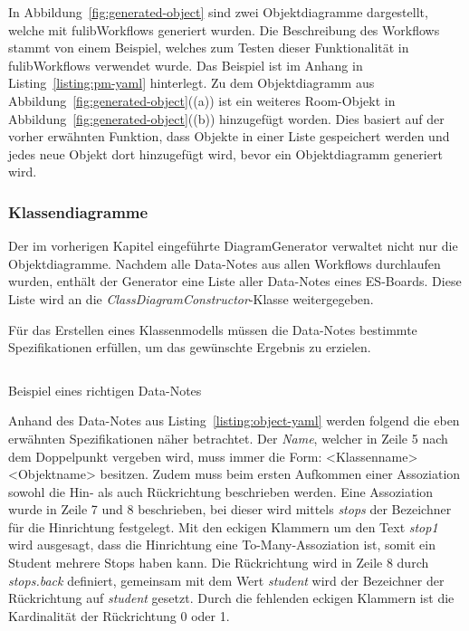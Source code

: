 
In Abbildung~\ref{fig:generated-object} sind zwei Objektdiagramme dargestellt, welche mit fulibWorkflows generiert wurden.
Die Beschreibung des Workflows stammt von einem Beispiel, welches zum Testen dieser Funktionalität in fulibWorkflows verwendet wurde.
Das Beispiel ist im Anhang in Listing~\ref{listing:pm-yaml} hinterlegt.
Zu dem Objektdiagramm aus Abbildung~\ref{fig:generated-object}((a)) ist ein weiteres Room-Objekt in Abbildung~\ref{fig:generated-object}((b)) hinzugefügt worden.
Dies basiert auf der vorher erwähnten Funktion, dass Objekte in einer Liste gespeichert werden und jedes neue Objekt dort hinzugefügt wird, bevor ein Objektdiagramm generiert wird.

\subsubsection{Klassendiagramme}
Der im vorherigen Kapitel eingeführte DiagramGenerator verwaltet nicht nur die Objektdiagramme.
Nachdem alle Data-Notes aus allen Workflows durchlaufen wurden, enthält der Generator eine Liste aller Data-Notes eines \ac{ES}-Boards.
Diese Liste wird an die \textit{ClassDiagramConstructor}-Klasse weitergegeben.

Für das Erstellen eines Klassenmodells müssen die Data-Notes bestimmte Spezifikationen erfüllen, um das gewünschte Ergebnis zu erzielen.

\begin{listing}[!ht]
    \inputminted[firstnumber=5]{yaml}{listings/3.1.4/data.es.yaml}
    \caption{Beispiel eines richtigen Data-Notes}
    \label{listing:object-yaml}
\end{listing}


Anhand des Data-Notes aus Listing~\ref{listing:object-yaml} werden folgend die eben erwähnten Spezifikationen näher betrachtet.
Der \textit{Name}, welcher in Zeile 5 nach dem Doppelpunkt vergeben wird, muss immer die Form: <Klassenname> <Objektname> besitzen.
Zudem muss beim ersten Aufkommen einer Assoziation sowohl die Hin- als auch Rückrichtung beschrieben werden.
Eine Assoziation wurde in Zeile 7 und 8 beschrieben, bei dieser wird mittels \textit{stops} der Bezeichner für die Hinrichtung festgelegt.
Mit den eckigen Klammern um den Text \textit{stop1} wird ausgesagt, dass die Hinrichtung eine To-Many-Assoziation ist, somit ein Student mehrere Stops haben kann.
Die Rückrichtung wird in Zeile 8 durch \textit{stops.back} definiert, gemeinsam mit dem Wert \textit{student} wird der Bezeichner
der Rückrichtung auf \textit{student} gesetzt.
Durch die fehlenden eckigen Klammern ist die Kardinalität der Rückrichtung 0 oder 1.

